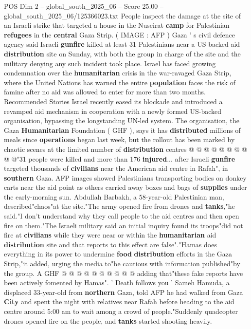 \begin{textsample}{POS Dim 2 – global\_south\_2025\_06 – Score 25.00 – global\_south\_2025\_06/125366023.txt}  \label{ex:f2_pos_089}
People inspect the damage at the site of an Israeli strike that targeted a house in the Nuseirat \textbf{camp} for Palestinian \textbf{refugees} in the \textbf{central} Gaza Strip. ( IMAGE : AFP ) Gaza ' s civil defence agency said Israeli \textbf{gunfire} killed at least 31 Palestinians near a US-backed aid \textbf{distribution} site on Sunday, with both the group in charge of the site and the military denying any such incident took place.
Israel has faced growing condemnation over the \textbf{humanitarian} crisis in the war-ravaged Gaza Strip, where the United Nations has warned the entire \textbf{population} faces the risk of famine after no aid was allowed to enter for more than two months.
Recommended Stories Israel recently eased its blockade and introduced a revamped aid mechanism in cooperation with a newly formed US-backed organisation, bypassing the longstanding UN-led system.
The organisation, the Gaza \textbf{Humanitarian} Foundation ( GHF ), says it has \textbf{distributed} millions of meals since \textbf{operations} began last week, but the rollout has been marked by chaotic scenes at the limited number of \textbf{distribution} centres @ @ @ @ @ @ @ @ @ @"31 people were killed and more than 176 \textbf{injured}... after Israeli \textbf{gunfire} targeted thousands of \textbf{civilians} near the American aid centre in Rafah", in \textbf{southern} Gaza.
AFP images showed Palestinians transporting bodies on donkey carts near the aid point as others carried away boxes and bags of \textbf{supplies} under the early-morning sun.
Abdullah Barbakh, a 58-year-old Palestinian man, described"chaos"at the site."The army opened fire from drones and \textbf{tanks},"he said."I don't understand why they call people to the aid centres and then open fire on them."The Israeli military said an initial inquiry found its troops"did not fire at \textbf{civilians} while they were near or within the \textbf{humanitarian} aid \textbf{distribution} site and that reports to this effect are false"."Hamas does everything in its power to undermine \textbf{food} \textbf{distribution} efforts in the Gaza Strip,"it added, urging the media to"be cautious with information published"by the group.
A GHF @ @ @ @ @ @ @ @ @ @ adding that"these fake reports have been actively fomented by Hamas". ' Death follows you ' Sameh Hamuda, a displaced 33-year-old from \textbf{northern} Gaza, told AFP he had walked from Gaza \textbf{City} and spent the night with relatives near Rafah before heading to the aid centre around 5:00 am to wait among a crowd of people."Suddenly quadcopter drones opened fire on the people, and \textbf{tanks} started shooting heavily.

\end{textsample}
